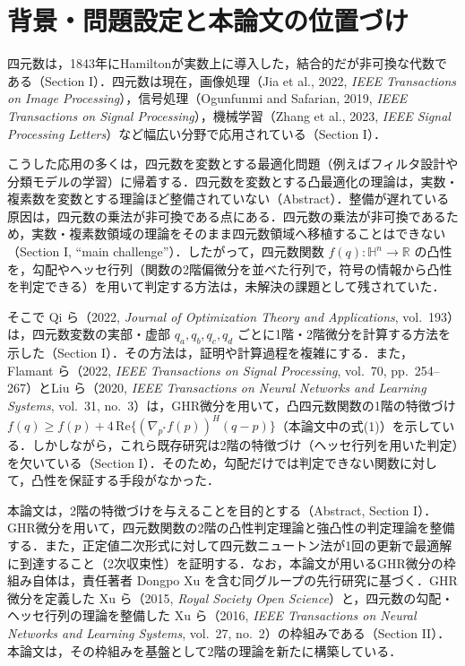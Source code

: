 \documentclass[twocolumn, 9pt]{jsarticle}
\begin{document}
\section{背景・問題設定と本論文の位置づけ}

四元数は，1843年にHamiltonが実数上に導入した，結合的だが非可換な代数である（Section I）．四元数は現在，画像処理（Jia et al., 2022, \textit{IEEE Transactions on Image Processing}），信号処理（Ogunfunmi and Safarian, 2019, \textit{IEEE Transactions on Signal Processing}），機械学習（Zhang et al., 2023, \textit{IEEE Signal Processing Letters}）など幅広い分野で応用されている（Section I）．

こうした応用の多くは，四元数を変数とする最適化問題（例えばフィルタ設計や分類モデルの学習）に帰着する．四元数を変数とする凸最適化の理論は，実数・複素数を変数とする理論ほど整備されていない（Abstract）．整備が遅れている原因は，四元数の乗法が非可換である点にある．四元数の乗法が非可換であるため，実数・複素数領域の理論をそのまま四元数領域へ移植することはできない（Section I, ``main challenge''）．したがって，四元数関数 $f(q):\mathbb{H}^n\to\mathbb{R}$ の凸性を，勾配やヘッセ行列（関数の2階偏微分を並べた行列で，符号の情報から凸性を判定できる）を用いて判定する方法は，未解決の課題として残されていた．

そこで Qi ら（2022, \textit{Journal of Optimization Theory and Applications}, vol.\ 193）は，四元数変数の実部・虚部 $q_a, q_b, q_c, q_d$ ごとに1階・2階微分を計算する方法を示した（Section I）．その方法は，証明や計算過程を複雑にする．また，Flamant ら（2022, \textit{IEEE Transactions on Signal Processing}, vol.\ 70, pp.\ 254--267）とLiu ら（2020, \textit{IEEE Transactions on Neural Networks and Learning Systems}, vol.\ 31, no.\ 3）は，GHR微分を用いて，凸四元数関数の1階の特徴づけ $f(q) \geq f(p) + 4\,\mathrm{Re}\{(\nabla_{p^*}f(p))^H(q-p)\}$（本論文中の式(1)）を示している．しかしながら，これら既存研究は2階の特徴づけ（ヘッセ行列を用いた判定）を欠いている（Section I）．そのため，勾配だけでは判定できない関数に対して，凸性を保証する手段がなかった．

本論文は，2階の特徴づけを与えることを目的とする（Abstract, Section I）．GHR微分を用いて，四元数関数の2階の凸性判定理論と強凸性の判定理論を整備する．また，正定値二次形式に対して四元数ニュートン法が1回の更新で最適解に到達すること（2次収束性）を証明する．なお，本論文が用いるGHR微分の枠組み自体は，責任著者 Dongpo Xu を含む同グループの先行研究に基づく．GHR微分を定義した Xu ら（2015, \textit{Royal Society Open Science}）と，四元数の勾配・ヘッセ行列の理論を整備した Xu ら（2016, \textit{IEEE Transactions on Neural Networks and Learning Systems}, vol.\ 27, no.\ 2）の枠組みである（Section II）．本論文は，その枠組みを基盤として2階の理論を新たに構築している．
\end{document}
